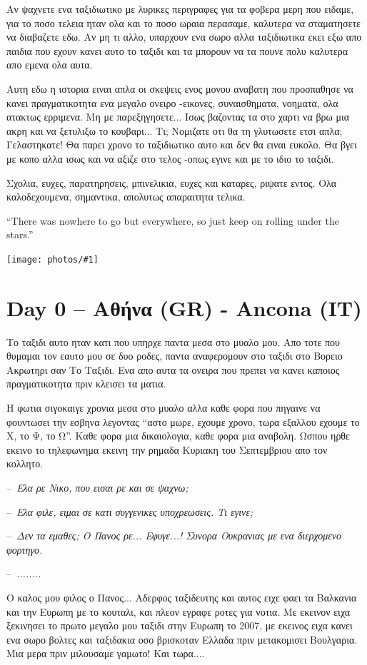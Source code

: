 \documentclass[11pt, letterpaper]{book}
\newcommand\dialogue[1]{\par\noindent--~\textit{#1}}
\newcommand\photo[1]{\noindent\texttt{[image: photos/\#1]}}
\begin{document}
Αν ψαχνετε ενα ταξιδιωτικο με λυρικες περιγραφες για τα φοβερα μερη που ειδαμε, για το ποσο τελεια ηταν ολα και το ποσο ωραια περασαμε, καλυτερα να σταματησετε να διαβαζετε εδω. Αν μη τι αλλο, υπαρχουν ενα σωρο αλλα ταξιδιωτικα εκει εξω απο παιδια που εχουν κανει αυτο το ταξιδι και τα μπορουν να τα πουνε πολυ καλυτερα απο εμενα ολα αυτα.

Αυτη εδω η ιστορια ειναι απλα οι σκεψεις ενος μονου αναβατη που προσπαθησε να κανει πραγματικοτητα ενα μεγαλο ονειρο -εικονες, συναισθηματα, νοηματα, ολα ατακτως ερριμενα.
Μη με παρεξηγησετε... Ισως βαζοντας τα στο χαρτι να βρω μια ακρη και να ξετυλιξω το κουβαρι...
Τι; Νομιζατε οτι θα τη γλυτωσετε ετσι απλα; Γελαστηκατε! Θα παρει χρονο το ταξιδιωτικο αυτο και δεν θα ειναι ευκολο.
Θα βγει με κοπο αλλα ισως και να αξιζε στο τελος -οπως εγινε και με το ιδιο το ταξιδι.

Σχολια, ευχες, παρατηρησεις, μπινελικια, ευχες και καταρες, ριψατε εντος. Ολα καλοδεχουμενα, σημαντικα, απολυτως απαραιτητα τελικα.

``There was nowhere to go but everywhere, so just keep on rolling under the stars.''

\photo{1.jpg}

\chapter{Day 0 -- Αθήνα (GR) - Ancona (IT)}

Το ταξιδι αυτο ηταν κατι που υπηρχε παντα μεσα στο μυαλο μου. Απο τοτε που θυμαμαι τον εαυτο μου σε δυο ροδες, παντα αναφερομουν στο ταξιδι στο Βορειο Ακρωτηρι σαν Το Ταξιδι. Eνα απο αυτα τα ονειρα που πρεπει να κανει καποιος πραγματικοτητα πριν κλεισει τα ματια.

Η φωτια σιγοκαιγε χρονια μεσα στο μυαλο αλλα καθε φορα που πηγαινε να φουντωσει την εσβηνα λεγοντας ``αστο μωρε, εχουμε χρονο, τωρα εξαλλου εχουμε το Χ, το Ψ, το Ω''. Καθε φορα μια δικαιολογια, καθε φορα μια αναβολη. Ωσπου ηρθε εκεινο το τηλεφωνημα εκεινη την ρημαδα Κυριακη του Σεπτεμβριου απο τον κολλητο.

\dialogue{Ελα ρε Νικο, που εισαι ρε και σε ψαχνω;}
\dialogue{Ελα φιλε, ειμαι σε κατι συγγενικες υποχρεωσεις. Τι εγινε;}
\dialogue{Δεν τα εμαθες; Ο Πανος ρε... Εφυγε...! Συνορα Ουκρανιας με ενα διερχομενο φορτηγο.}
\dialogue{........}

Ο καλος μου φιλος ο Πανος... Αδερφος ταξιδευτης και αυτος ειχε φαει τα Βαλκανια και την Ευρωπη με το κουταλι, και πλεον εγραφε ροτες για νοτια. Με εκεινον ειχα ξεκινησει το πρωτο μεγαλο μου ταξιδι στην Ευρωπη το 2007, με εκεινος ειχα κανει ενα σωρο βολτες και ταξιδακια οσο βρισκοταν Ελλαδα πριν μετακομισει Βουλγαρια. Μια μερα πριν μιλουσαμε γαμωτο! Και τωρα....
\end{document}
